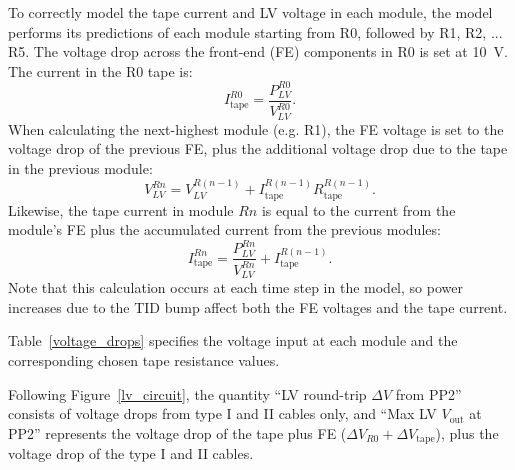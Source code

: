 To correctly model the tape current and LV voltage in each module, the model performs its predictions
of each module starting from R0, followed by R1, R2, ... R5. The voltage drop across the front-end (FE)
components in R0 is set at 10~V. The current in the R0 tape is:
%
\[
I^{R0}_\text{tape} = \frac{P^{R0}_{LV}}{V^{R0}_{LV}}.
\]
When calculating the next-highest module (e.g. R1), the FE voltage is set to the voltage drop of the
previous FE, plus the additional voltage drop due to the tape in the previous module:
\[
V^{Rn}_{LV} = V^{R(n-1)}_{LV} + I^{R(n-1)}_\text{tape} R^{R(n-1)}_\text{tape}.
\]
Likewise, the tape current in module $Rn$ is equal to the current from the module's FE plus the
accumulated current from the previous modules:
\[
I^{Rn}_\text{tape} = \frac{P^{Rn}_{LV}}{V^{Rn}_{LV}} + I^{R(n-1)}_\text{tape}.
\]
Note that this calculation occurs at each time step in the model, so power increases due to the TID
bump affect both the FE voltages and the tape current.

Table~\ref{voltage_drops} specifies the voltage input at each module and
the corresponding chosen tape resistance values.

\begin{table}[ht]
\begin{center}
\end{center}
\caption{Voltage inputs for each endcap module. The EOS is assumed to have an 11V input voltage.}
\label{voltage_drops}
\end{table}

Following Figure~\ref{lv_circuit}, the
quantity ``LV round-trip $\Delta V$ from PP2'' consists of voltage drops from type I and II cables
only, and ``Max LV $V_\text{out}$ at PP2'' represents the voltage drop of the tape plus FE
($\Delta V_{R0} + \Delta V_\text{tape}$), plus the voltage drop of the type I and II cables.

